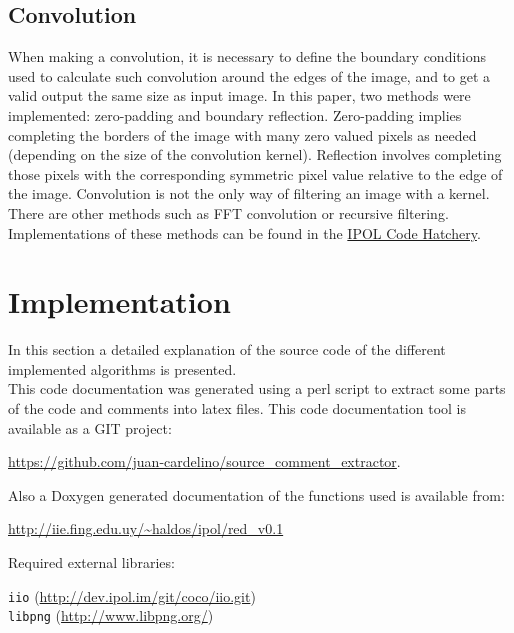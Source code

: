 \documentclass{ipol}
\numberwithin{equation}{section}
\numberwithin{table}{section}
\numberwithin{figure}{section}
\begin{document}

\subsection{Convolution}

When making a convolution, it is necessary to define the boundary conditions used to calculate such convolution 
around the edges of the image, and to get a valid output the same size as input image. In this paper, 
two methods were implemented: zero-padding and boundary reflection. Zero-padding implies completing 
the borders of the image with many zero valued pixels as needed (depending on the size of the convolution 
kernel). Reflection involves completing those pixels with the corresponding symmetric pixel value 
relative to the edge of the image. Convolution is not the only way of filtering an image with a kernel. There are other methods such as FFT convolution 
or recursive filtering. Implementations of these methods can be found in the \href{https://tools.ipol.im/wiki/author/code/hatchery/}{IPOL Code Hatchery}.


\section{Implementation}
\label{sec:appendix2}

In this section a detailed explanation of the source code of the different implemented algorithms
is presented. \\

This code documentation was generated using a perl script to extract some parts of the 
code and comments into latex files. This code documentation tool is available as a GIT
project: 
\begin{center} 
\url{https://github.com/juan-cardelino/source_comment_extractor}. \\
\end{center}
Also a Doxygen generated documentation of the functions used is available from:
\begin{center}
\url{http://iie.fing.edu.uy/~haldos/ipol/red_v0.1} \\
\end{center}
Required external libraries: 
\begin{center}
\texttt{iio} (\url{http://dev.ipol.im/git/coco/iio.git}) \\
\texttt{libpng} (\url{http://www.libpng.org/})
\end{center}
\end{document}
